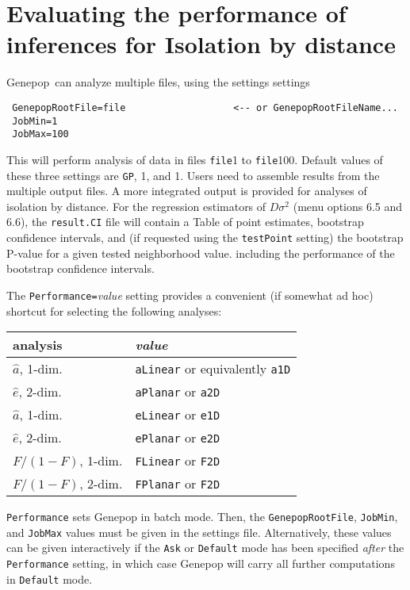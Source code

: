 \documentclass[12pt,]{book}
\begin{document}
\chapter{Evaluating the performance of inferences for Isolation by
distance}\label{evaluating-the-performance-of-inferences-for-isolation-by-distance}

Genepop~can analyze multiple files, using the settings settings

\begin{verbatim}
 GenepopRootFile=file                   <-- or GenepopRootFileName...
 JobMin=1
 JobMax=100
\end{verbatim}

   This will
perform analysis of data in files \texttt{file}1 to \texttt{file}100.
Default values of these three settings are \texttt{GP}, 1, and 1. Users
need to assemble results from the multiple output files. A more
integrated output is provided for analyses of isolation by distance. For
the regression estimators of \(D\sigma^2\) (menu options 6.5 and 6.6),
the \texttt{result.CI} file will contain a Table of point estimates,
bootstrap confidence intervals, and (if requested using the
\texttt{testPoint} setting) the bootstrap P-value for a given tested
neighborhood value. including the performance of the bootstrap
confidence intervals.

The \texttt{Performance=}\emph{value} setting
provides a convenient (if somewhat ad hoc) shortcut for selecting the
following analyses:

\begin{longtable}[]{@{}ll@{}}
\toprule
analysis & \emph{value}\tabularnewline
\midrule
\endhead
\(\hat{a}\), 1-dim. & \texttt{aLinear} or equivalently
\texttt{a1D}\tabularnewline
\(\hat{e}\), 2-dim. & \texttt{aPlanar} or \texttt{a2D}\tabularnewline
\(\hat{a}\), 1-dim. & \texttt{eLinear} or \texttt{e1D}\tabularnewline
\(\hat{e}\), 2-dim. & \texttt{ePlanar} or \texttt{e2D}\tabularnewline
\(F/(1-F)\), 1-dim. & \texttt{FLinear} or \texttt{F2D}\tabularnewline
\(F/(1-F)\), 2-dim. & \texttt{FPlanar} or \texttt{F2D}\tabularnewline
\bottomrule
\end{longtable}

\texttt{Performance} sets Genepop in batch mode. Then,
the \texttt{GenepopRootFile}, \texttt{JobMin}, and \texttt{JobMax}
values must be given in the settings file. Alternatively, these values
can be given interactively if the \texttt{Ask} or \texttt{Default} mode
 has been specified \emph{after} the \texttt{Performance}
setting, in which case Genepop will carry all further computations in
\texttt{Default} mode.
\end{document}
